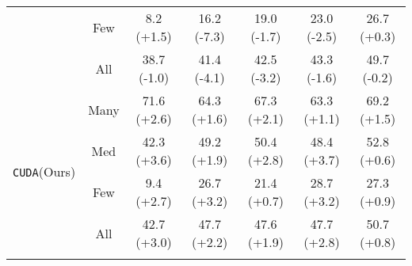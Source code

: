 \documentclass{article}
\def\code#1{\texttt{#1}}
\newcommand{\thickhline}{\hlineB{4}}
\newcommand{\alg}{\code{CUDA}\xspace}
\begin{document}
{\begin{table}[ht]
{{\begin{tabular}{l|c|ccccc}
                                     & Few      & 8.2 (+1.5)             & 16.2 (-7.3)                & 19.0 (-1.7)                  & 23.0 (-2.5)            & 26.7 (+0.3)              \\
                                     & All      & 38.7 (-1.0)            & 41.4 (-4.1)                 & 42.5 (-3.2)                  & 43.3 (-1.6)            & 49.7 (-0.2)              \\ \midrule
\multirow{4}{*}{\alg (Ours)}         & Many     & 71.6 (+2.6)            & 64.3 (+1.6)                & 67.3 (+2.1)                  & 63.3 (+1.1)            & 69.2 (+1.5)              \\
                                     & Med      & 42.3 (+3.6)            & 49.2 (+1.9)                & 50.4 (+2.8)                  & 48.4 (+3.7)            & 52.8 (+0.6)              \\
                                     & Few      & 9.4 (+2.7)             & 26.7 (+3.2)                & 21.4 (+0.7)                  & 28.7 (+3.2)            & 27.3 (+0.9)              \\
                                     & All      & 42.7 (+3.0)            & 47.7 (+2.2)                & 47.6 (+1.9)                  & 47.7 (+2.8)            & 50.7 (+0.8)             \\
\thickhline
\end{tabular}}}
\end{table} }



  
\end{document}
